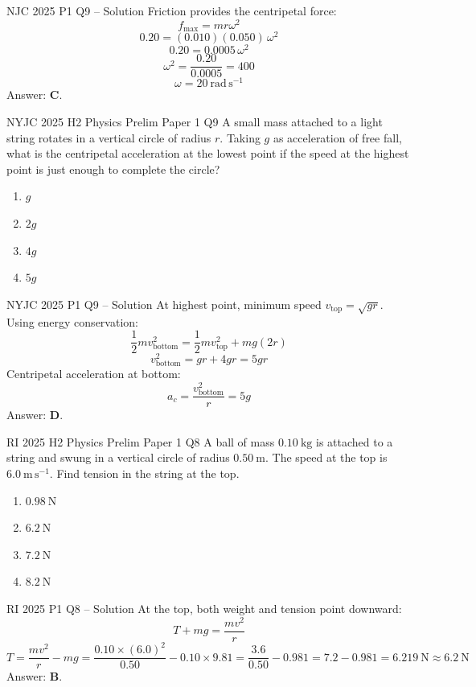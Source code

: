 \documentclass[11pt]{beamer}
\begin{document}
\begin{frame}{NJC 2025 P1 Q9 – Solution}
Friction provides the centripetal force:
\[ f_{\max} = m r \omega^2 \]
\[ 0.20 = (0.010)(0.050)\,\omega^2 \]
\[ 0.20 = 0.0005\,\omega^2 \]
\[ \omega^2 = \frac{0.20}{0.0005} = 400 \]
\[ \omega = 20\ \mathrm{rad\,s^{-1}} \]
Answer: \textbf{C}.
\end{frame}

\begin{frame}[shrink=15]{NYJC 2025 H2 Physics Prelim Paper 1 Q9}
A small mass attached to a light string rotates in a vertical circle of radius $r$. Taking $g$ as acceleration of free fall, what is the centripetal acceleration at the lowest point if the speed at the highest point is just enough to complete the circle?
\begin{enumerate}[A]
    \item $g$
    \item $2g$
    \item $4g$
    \item $5g$
\end{enumerate}
\end{frame}

\begin{frame}{NYJC 2025 P1 Q9 – Solution}
At highest point, minimum speed $v_{\text{top}} = \sqrt{gr}$. Using energy conservation:
\[ \frac12 m v_{\text{bottom}}^2 = \frac12 m v_{\text{top}}^2 + mg(2r) \]
\[ v_{\text{bottom}}^2 = gr + 4gr = 5gr \]
Centripetal acceleration at bottom:
\[ a_c = \frac{v_{\text{bottom}}^2}{r} = 5g \]
Answer: \textbf{D}.
\end{frame}

\begin{frame}[shrink=15]{RI 2025 H2 Physics Prelim Paper 1 Q8}
A ball of mass $0.10\ \mathrm{kg}$ is attached to a string and swung in a vertical circle of radius $0.50\ \mathrm{m}$. The speed at the top is $6.0\ \mathrm{m\,s^{-1}}$. Find tension in the string at the top.
\begin{enumerate}[A]
    \item $0.98\ \mathrm{N}$
    \item $6.2\ \mathrm{N}$
    \item $7.2\ \mathrm{N}$
    \item $8.2\ \mathrm{N}$
\end{enumerate}
\end{frame}

\begin{frame}{RI 2025 P1 Q8 – Solution}
At the top, both weight and tension point downward:
\[ T + mg = \frac{mv^2}{r} \]
\[ T = \frac{mv^2}{r} - mg = \frac{0.10\times(6.0)^2}{0.50} - 0.10\times9.81 = \frac{3.6}{0.50} - 0.981 = 7.2 - 0.981 = 6.219\ \mathrm{N} \approx 6.2\ \mathrm{N} \]
Answer: \textbf{B}.
\end{frame}
\end{document}
